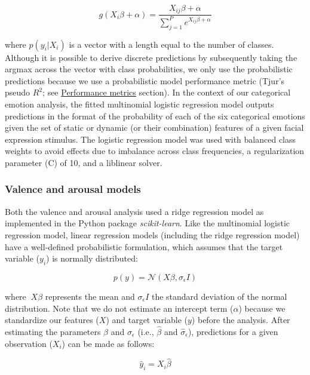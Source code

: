 \documentclass[11pt,american,a4paper,oneside,]{memoir} %
\begin{document}
\begin{equation}
g(X_{i}\beta + \alpha) = \frac{X_{ij}\beta + \alpha}{\sum_{j=1}^{P}e^{X_{ij}\beta + \alpha}}
\end{equation}

where \(p(y_{i} | X_{i})\) is a vector with a length equal to the number of classes. Although it is possible to derive discrete predictions by subsequently taking the argmax across the vector with class probabilities, we only use the probabilistic predictions because we use a probabilistic model performance metric (Tjur's pseudo \(R^{2}\); see \protect\hyperlink{svsd-perf}{Performance metrics} section). In the context of our categorical emotion analysis, the fitted multinomial logistic regression model outputs predictions in the format of the probability of each of the six categorical emotions given the set of static or dynamic (or their combination) features of a given facial expression stimulus. The logistic regression model was used with balanced class weights to avoid effects due to imbalance across class frequencies, a regularization parameter (C) of 10, and a liblinear solver.

\hypertarget{svsd-valaro}{%
\subsubsection{Valence and arousal models}\label{svsd-valaro}}

Both the valence and arousal analysis used a ridge regression model as implemented in the Python package \emph{scikit-learn}. Like the multinomial logistic regression model, linear regression models (including the ridge regression model) have a well-defined probabilistic formulation, which assumes that the target variable (\(y_{i}\)) is normally distributed:

\begin{equation}
p(y) = \mathcal{N}(X\beta, \sigma_{\epsilon}I)
\end{equation}

where \(~X\beta\) represents the mean and \(\sigma_{\epsilon}I\) the standard deviation of the normal distribution. Note that we do not estimate an intercept term (\(\alpha\)) because we standardize our features (\(X\)) and target variable (\(y\)) before the analysis. After estimating the parameters \(\beta\) and \(\sigma_{\epsilon}\) (i.e., \(\hat{\beta}\) and \(\hat{\sigma}_{\epsilon}\)), predictions for a given observation (\(X_{i}\)) can be made as follows:

\begin{equation}
\hat{y}_{i} = X_{i}\hat{\beta}
\end{equation}
\end{document}
